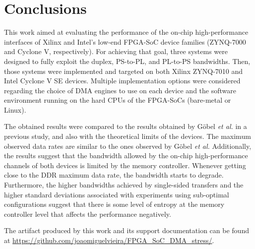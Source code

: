 \section{Conclusions}\label{sec:conclusions}

This work aimed at evaluating the performance of the on-chip high-performance interfaces of Xilinx and Intel's low-end \ac{FPGA}-\ac{SoC} device families (ZYNQ-7000 and Cyclone V, respectively). For achieving that goal, three systems were designed to fully exploit the duplex, \ac{PS}-to-\ac{PL}, and \ac{PL}-to-\ac{PS} bandwidths. Then, those systems were implemented and targeted on both Xilinx ZYNQ-7010 and Intel Cyclone V SE devices. Multiple implementation options were considered regarding the choice of \ac{DMA} engines to use on each device and the software environment running on the hard \acp{CPU} of the \ac{FPGA}-\acp{SoC} (bare-metal or Linux).

The obtained results were compared to the results obtained by G{\"{o}}bel \textit{et al.} in a previous study, and also with the theoretical limits of the devices. The maximum observed data rates are similar to the ones observed by G{\"{o}}bel \textit{et al.} Additionally, the results suggest that the bandwidth allowed by the on-chip high-performance channels of both devices is limited by the memory controller. Whenever getting close to the DDR maximum data rate, the bandwidth starts to degrade. Furthermore, the higher bandwidths achieved by single-sided transfers and the higher standard deviations associated with experiments using sub-optimal configurations suggest that there is some level of entropy at the memory controller level that affects the performance negatively.

The artifact produced by this work and its support documentation can be found at \url{https://github.com/joaomiguelvieira/FPGA_SoC_DMA_stress/}.